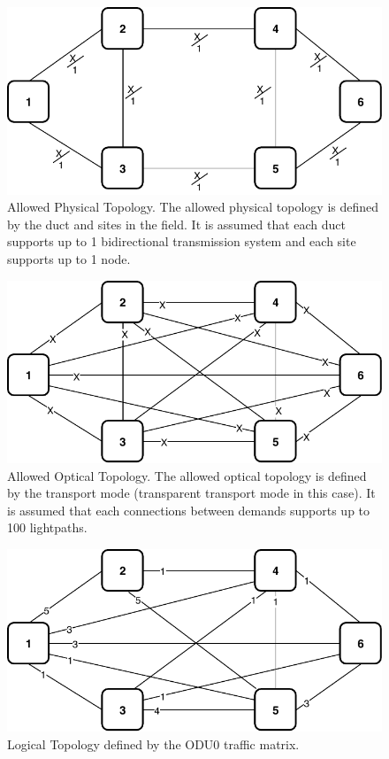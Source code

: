 \newpage
\vspace{20pt}
\begin{figure}[h!]
\centering
\includegraphics[width=13cm]{sdf/ilp/transparent_survivability/figures/allowed_physical_topology}
\caption{Allowed Physical Topology. The allowed physical topology is defined by the duct and sites in the field. It is assumed that each duct supports up to 1 bidirectional transmission system and each site supports up to 1 node.}
\label{allowed2_physical_low}
\end{figure}

\vspace{20pt}
\begin{figure}[h!]
\centering
\includegraphics[width=13cm]{sdf/ilp/transparent_survivability/figures/allowed_optical_topology}
\caption{Allowed Optical Topology. The allowed optical topology is defined by the transport mode (transparent transport mode in this case). It is assumed that each connections between demands supports up to 100 lightpaths.}
\label{allowed2_optical_low}
\end{figure}

\newpage
\begin{figure}[h!]
\centering
\includegraphics[width=12cm]{sdf/ilp/transparent_survivability/figures/logical_topology_ODU0_low}
\caption{Logical Topology defined by the ODU0 traffic matrix.}
\label{logical2_ODU0_low}
\end{figure}

